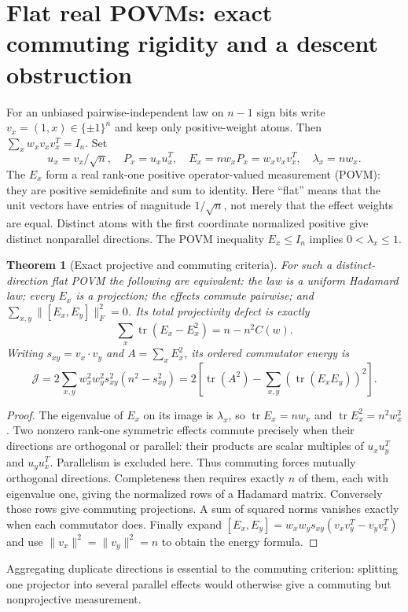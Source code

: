 \documentclass[11pt]{article}
\newtheorem{theorem}{Theorem}[section]
\begin{document}
\section{Flat real POVMs: exact commuting rigidity and a descent obstruction}
For an unbiased pairwise-independent law on $n-1$ sign bits write
$v_x=(1,x)\in\{\pm1\}^n$ and keep only positive-weight atoms.
Then $\sum_xw_xv_xv_x^T=I_n$. Set
\[
 u_x=v_x/\sqrt n,\quad P_x=u_xu_x^T,\quad
 E_x=nw_xP_x=w_xv_xv_x^T,\quad\lambda_x=nw_x.
\]
The $E_x$ form a real rank-one positive operator-valued measurement
(POVM): they are positive semidefinite and sum to identity.
Here ``flat'' means that the unit vectors have entries of magnitude
$1/\sqrt n$, not merely that the effect weights are equal.
Distinct atoms with the first coordinate normalized positive give
distinct nonparallel directions. The POVM inequality $E_x\le I_n$
implies $0<\lambda_x\le1$.

\begin{theorem}[Exact projective and commuting criteria]
For such a distinct-direction flat POVM the following are equivalent:
the law is a uniform Hadamard law; every $E_x$ is a projection;
the effects commute pairwise; and
$\sum_{x,y}\|[E_x,E_y]\|_F^2=0$.
Its total projectivity defect is exactly
\[
 \sum_x\operatorname{tr}(E_x-E_x^2)=n-n^2C(w).
\]
Writing $s_{xy}=v_x\cdot v_y$ and $A=\sum_xE_x^2$, its ordered
commutator energy is
\[
 \mathcal J=2\sum_{x,y}w_x^2w_y^2s_{xy}^2(n^2-s_{xy}^2)
 =2\left[\operatorname{tr}(A^2)-
                 \sum_{x,y}(\operatorname{tr}(E_xE_y))^2\right].
\]
\end{theorem}
\begin{proof}
The eigenvalue of $E_x$ on its image is $\lambda_x$, so
$\operatorname{tr}E_x=nw_x$ and $\operatorname{tr}E_x^2=n^2w_x^2$.
Two nonzero rank-one symmetric effects commute precisely when their
directions are orthogonal or parallel: their products are scalar
multiples of $u_xu_y^T$ and $u_yu_x^T$. Parallelism is excluded here.
Thus commuting forces mutually orthogonal directions. Completeness
then requires exactly $n$ of them, each with eigenvalue one, giving
the normalized rows of a Hadamard matrix. Conversely those rows give
commuting projections. A sum of squared norms vanishes exactly when
each commutator does. Finally expand
$[E_x,E_y]=w_xw_ys_{xy}(v_xv_y^T-v_yv_x^T)$ and use
$\|v_x\|^2=\|v_y\|^2=n$ to obtain the energy formula.
\end{proof}
Aggregating duplicate directions is essential to the commuting
criterion: splitting one projector into several parallel effects
would otherwise give a commuting but nonprojective measurement.
\end{document}
